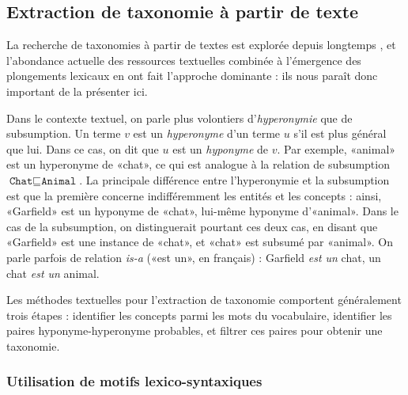 \subsection{Extraction de taxonomie à partir de texte}
\label{subsec:litt-te-text}

La recherche de taxonomies à partir de textes est explorée depuis longtemps \cite{hearst1992automatic}, et l'abondance actuelle des ressources textuelles \cite{gigaword2012, smith2013dirt} combinée à l'émergence des plongements lexicaux en ont fait l'approche dominante : ils nous paraît donc important de la présenter ici.


Dans le contexte textuel, on parle plus volontiers d'\textit{hyperonymie} que de subsumption. Un terme $v$ est un \textit{hyperonyme} d'un terme $u$ s'il est plus général que lui. Dans ce cas, on dit que $u$ est un \textit{hyponyme} de $v$. Par exemple, «animal» est un hyperonyme de «chat», ce qui est analogue à la relation de subsumption $\texttt{Chat} \sqsubseteq \texttt{Animal}$. La principale différence entre l'hyperonymie et la subsumption est que la première concerne indifféremment les entités et les concepts : ainsi, «Garfield» est un hyponyme de «chat», lui-même hyponyme d'«animal». Dans le cas de la subsumption, on distinguerait pourtant ces deux cas, en disant que «Garfield» est une instance de «chat», et «chat» est subsumé par «animal». On parle parfois de relation \textit{is-a} («est un», en français) : Garfield \textit{est un} chat, un chat \textit{est un} animal.

Les méthodes textuelles pour l'extraction de taxonomie comportent généralement trois étapes : identifier les concepts parmi les mots du vocabulaire, identifier les paires hyponyme-hyperonyme probables, et filtrer ces paires pour obtenir une taxonomie.


\subsubsection{Utilisation de motifs lexico-syntaxiques}

